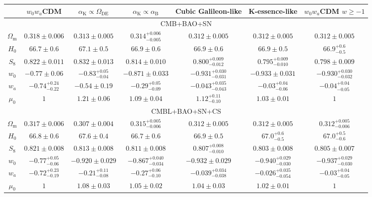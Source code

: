 \begin{tabular}{|c|c|c|c|c|c|c|}
\hline
 & $w_0w_a$CDM & $\alpha_\mathrm{K} \propto \Omega_\mathrm{DE}$ & $\alpha_\mathrm{K} \propto \alpha_\mathrm{B}$ & Cubic Galileon-like & K-essence-like & $w_0w_a$CDM $w \geq -1$ \\ \hline
\multicolumn{7}{|c|}{CMB+BAO+SN} \\ \hline
$\Omega_\mathrm{m}$ & $0.318 \pm 0.006$ & $0.313 \pm 0.005$ & $0.314^{+0.006}_{-0.005}$ & $0.312 \pm 0.005$ & $0.312 \pm 0.005$ & $0.312 \pm 0.005$ \\ \hline
$H_0$ & $66.7 \pm 0.6$ & $67.1 \pm 0.5$ & $66.9 \pm 0.6$ & $66.9 \pm 0.6$ & $66.9 \pm 0.5$ & $66.9^{+0.6}_{-0.5}$ \\ \hline
$S_8$ & $0.822 \pm 0.011$ & $0.832 \pm 0.013$ & $0.814 \pm 0.010$ & $0.800^{+0.009}_{-0.012}$ & $0.795^{+0.009}_{-0.010}$ & $0.798 \pm 0.009$ \\ \hline
$w_0$ & $-0.77 \pm 0.06$ & $-0.83^{+0.05}_{-0.04}$ & $-0.871 \pm 0.033$ & $-0.931^{+0.030}_{-0.031}$ & $-0.933 \pm 0.031$ & $-0.930^{+0.030}_{-0.032}$ \\ \hline
$w_a$ & $-0.74^{+0.24}_{-0.22}$ & $-0.54 \pm 0.19$ & $-0.29^{+0.05}_{-0.09}$ & $-0.043^{+0.035}_{-0.043}$ & $-0.03^{+0.04}_{-0.06}$ & $-0.04^{+0.04}_{-0.05}$ \\ \hline
$\mu_0$ & $1$ & $1.21 \pm 0.06$ & $1.09 \pm 0.04$ & $1.12^{+0.11}_{-0.10}$ & $1.03 \pm 0.01$ & $1$ \\ \hline
\multicolumn{7}{|c|}{CMBL+BAO+SN+CS} \\ \hline
$\Omega_\mathrm{m}$ & $0.317 \pm 0.006$ & $0.307 \pm 0.004$ & $0.315^{+0.005}_{-0.006}$ & $0.312 \pm 0.005$ & $0.312 \pm 0.005$ & $0.312^{+0.005}_{-0.006}$ \\ \hline
$H_0$ & $66.8 \pm 0.6$ & $67.6 \pm 0.4$ & $66.7 \pm 0.6$ & $66.9 \pm 0.5$ & $67.0^{+0.6}_{-0.5}$ & $67.0^{+0.5}_{-0.6}$ \\ \hline
$S_8$ & $0.821 \pm 0.008$ & $0.813 \pm 0.008$ & $0.811 \pm 0.008$ & $0.807^{+0.008}_{-0.010}$ & $0.803 \pm 0.008$ & $0.805 \pm 0.007$ \\ \hline
$w_0$ & $-0.77^{+0.05}_{-0.06}$ & $-0.920 \pm 0.029$ & $-0.867^{+0.040}_{-0.034}$ & $-0.932 \pm 0.029$ & $-0.940^{+0.029}_{-0.030}$ & $-0.937^{+0.029}_{-0.030}$ \\ \hline
$w_a$ & $-0.72^{+0.23}_{-0.19}$ & $-0.21^{+0.11}_{-0.08}$ & $-0.27^{+0.06}_{-0.10}$ & $-0.039^{+0.034}_{-0.038}$ & $-0.026^{+0.035}_{-0.054}$ & $-0.03^{+0.04}_{-0.05}$ \\ \hline
$\mu_0$ & $1$ & $1.08 \pm 0.03$ & $1.05 \pm 0.02$ & $1.04 \pm 0.03$ & $1.02 \pm 0.01$ & $1$ \\ \hline
\end{tabular}
